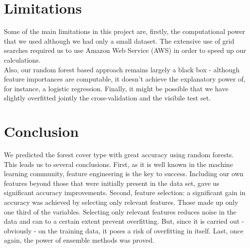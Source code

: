 \documentclass[paper=a4, fontsize=11pt]{scrartcl}
\numberwithin{equation}{section}
\numberwithin{figure}{section}
\numberwithin{table}{section}
\begin{document}


\section{Limitations}

Some of the main limitations in this project are, firstly, the computational power that we used although we had only a small dataset. 
The extensive use of grid searches required us to use Amazon Web Service (AWS) in order to speed up our calculations. \\ 
Also, our random forest based approach remains largely a black box - although feature importances are computable, it doesn't achieve the explanatory power of, for instance, a logistic regression. 
Finally, it might be possible that we have slightly overfitted jointly the cross-validation and  the visibile test set.

\section{Conclusion}

We predicted the forest cover type with great accuracy using random forests. This leads us to several conclusions. First, as it is well known in the machine learning community, feature engineering is the key to success. Including our own features beyond those that were initially present in the data set, gave us significant accuracy improvements. Second, feature selection: a significant gain in accuracy was achieved by selecting only relevant features. Those made up only one third of the variables. Selecting only relevant features reduces noise in the data and can to a certain extent prevent overfitting. But, since it is carried out - obviously - on the training data, it poses a risk of overfitting in itself. 
Last, once again, the power of ensemble methods was proved. 






	
\end{document}

